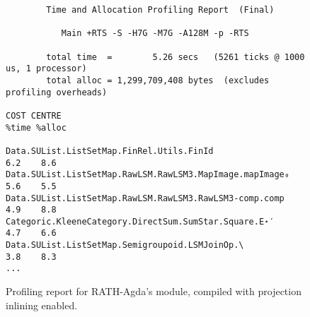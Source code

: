\begin{figure}
\begin{verbatim}
        Time and Allocation Profiling Report  (Final)

           Main +RTS -S -H7G -M7G -A128M -p -RTS

        total time  =        5.26 secs   (5261 ticks @ 1000 us, 1 processor)
        total alloc = 1,299,709,408 bytes  (excludes profiling overheads)

COST CENTRE                                                 %time %alloc

Data.SUList.ListSetMap.FinRel.Utils.FinId                     6.2    8.6
Data.SUList.ListSetMap.RawLSM.RawLSM3.MapImage.mapImage₀      5.6    5.5
Data.SUList.ListSetMap.RawLSM.RawLSM3.RawLSM3-comp.comp       4.9    8.8
Categoric.KleeneCategory.DirectSum.SumStar.Square.E⋆′         4.7    6.6
Data.SUList.ListSetMap.Semigroupoid.LSMJoinOp.\               3.8    8.3
...
\end{verbatim}
\caption{Profiling report for RATH-Agda's  module, compiled with projection inlining enabled.}
\label{fig:main_inline_prof}
\end{figure}
